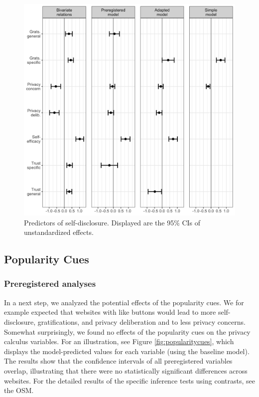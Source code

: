 \documentclass[
  english,
  man,floatsintext]{apa6}
\begin{document}
\begin{figure}[!h]
\includegraphics[width=\textwidth]{figures/results/coeffs} \caption{Predictors of self-disclosure. Displayed are the 95\% CIs of unstandardized effects.}\label{fig:plotpc}
\end{figure}

\hypertarget{popularity-cues}{%
\subsection{Popularity Cues}\label{popularity-cues}}

\hypertarget{preregistered-analyses-1}{%
\subsubsection{Preregistered analyses}\label{preregistered-analyses-1}}

In a next step, we analyzed the potential effects of the popularity cues.
We for example expected that websites with like buttons would lead to more self-disclosure, gratifications, and privacy deliberation and to less privacy concerns.
Somewhat surprisingly, we found no effects of the popularity cues on the privacy calculus variables.
For an illustration, see Figure \ref{fig:popularitycues}, which displays the model-predicted values for each variable (using the baseline model).
The results show that the confidence intervals of all preregistered variables overlap, illustrating that there were no statistically significant differences across websites.
For the detailed results of the specific inference tests using contrasts, see the OSM.
\end{document}
